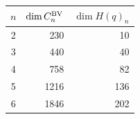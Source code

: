\begin{tabular}{c|r|r}
$n$ & $\dim C^{\rm BV}_n$ & $\dim H(q)_n$ \\
\hline
2 & 230 & 10 \\
3 & 440 & 40 \\
4 & 758 & 82 \\
5 & 1216 & 136 \\
6 & 1846 & 202 \\
\end{tabular}
